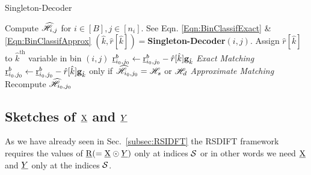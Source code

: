 \begin{enumerate}
\begin{algorithm}[h!]
\caption{Singleton-Decoder}
\label{Algo:SingletonDecoder}
\begin{algorithmic}
\State Compute $\widehat{\mathscr{H}}_{i,j}$ for $i\in[B], j\in[n_i]$. See Eqn. \eqref{Eqn:BinClassifExact} \& \eqref{Eqn:BinClassifApprox}
\vspace{\gap}
\vspace{\gap}
  \State $(\hat{k},\hat{r}[\hat{k}])=${\bf Singleton-Decoder}$(i,j)$.%
\vspace{\gap}
  \State Assign $\hat{r}[\hat{k}]$ to $\hat{k}^{\text{th}}$ variable in bin $(i,j)$
\vspace{\gap}
\vspace{\gap}
	   \State $\underline{\mathrm{r}}^{b}_{i_0,j_0}\gets\underline{\mathrm{r}}^{b}_{i_0,j_0}-\hat{r}[\hat{k}]\mathbf{g}_{\hat{k}}$   \hspace{45.5ex} {\it Exact Matching}
	   \vspace{\gap}
	   \State $\underline{\mathrm{r}}^{b}_{i_0,j_0}\gets\underline{\mathrm{r}}^{b}_{i_0,j_0}-\hat{r}[\hat{k}]\mathbf{g}_{\hat{k}}$   \hspace{10ex} only if $\widehat{\mathscr{H}}_{i_0,j_0}=\mathscr{H}_s$ or $\mathscr{H}_d$ \hspace{10ex} {\it Approximate Matching}
	   \vspace{\gap}
	   \State Recompute $\widehat{\mathscr{H}}_{i_0,j_0}$
      \EndFor
\EndWhile
\end{algorithmic}
\end{algorithm}

\subsection{Sketches of $\underline{\mathrm{X}}$ and $\underline{Y}$} 
\label{subsec:skteches}		 
 As we have already seen in Sec.~\ref{subsec:RSIDFT} the RSDIFT framework requires the values of $\underline{\mathrm{R}}(=\underline{\mathrm{X}}\odot \underline{Y})$ only at indices $\mathcal{S}$ or in other words we need $\underline{\mathrm{X}}$ and $\underline{Y}$ only at the indices $\mathcal{S}$. \\
% 


\end{enumerate}

